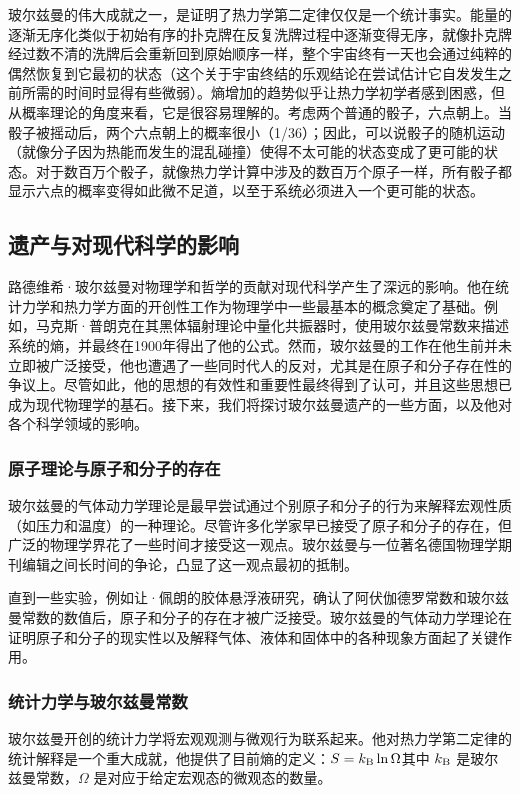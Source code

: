玻尔兹曼的伟大成就之一，是证明了热力学第二定律仅仅是一个统计事实。能量的逐渐无序化类似于初始有序的扑克牌在反复洗牌过程中逐渐变得无序，就像扑克牌经过数不清的洗牌后会重新回到原始顺序一样，整个宇宙终有一天也会通过纯粹的偶然恢复到它最初的状态（这个关于宇宙终结的乐观结论在尝试估计它自发发生之前所需的时间时显得有些微弱）。熵增加的趋势似乎让热力学初学者感到困惑，但从概率理论的角度来看，它是很容易理解的。考虑两个普通的骰子，六点朝上。当骰子被摇动后，两个六点朝上的概率很小（1/36）；因此，可以说骰子的随机运动（就像分子因为热能而发生的混乱碰撞）使得不太可能的状态变成了更可能的状态。对于数百万个骰子，就像热力学计算中涉及的数百万个原子一样，所有骰子都显示六点的概率变得如此微不足道，以至于系统必须进入一个更可能的状态。
\subsection{遗产与对现代科学的影响}
路德维希·玻尔兹曼对物理学和哲学的贡献对现代科学产生了深远的影响。他在统计力学和热力学方面的开创性工作为物理学中一些最基本的概念奠定了基础。例如，马克斯·普朗克在其黑体辐射理论中量化共振器时，使用玻尔兹曼常数来描述系统的熵，并最终在1900年得出了他的公式。然而，玻尔兹曼的工作在他生前并未立即被广泛接受，他也遭遇了一些同时代人的反对，尤其是在原子和分子存在性的争议上。尽管如此，他的思想的有效性和重要性最终得到了认可，并且这些思想已成为现代物理学的基石。接下来，我们将探讨玻尔兹曼遗产的一些方面，以及他对各个科学领域的影响。
\subsubsection{原子理论与原子和分子的存在}
玻尔兹曼的气体动力学理论是最早尝试通过个别原子和分子的行为来解释宏观性质（如压力和温度）的一种理论。尽管许多化学家早已接受了原子和分子的存在，但广泛的物理学界花了一些时间才接受这一观点。玻尔兹曼与一位著名德国物理学期刊编辑之间长时间的争论，凸显了这一观点最初的抵制。

直到一些实验，例如让·佩朗的胶体悬浮液研究，确认了阿伏伽德罗常数和玻尔兹曼常数的数值后，原子和分子的存在才被广泛接受。玻尔兹曼的气体动力学理论在证明原子和分子的现实性以及解释气体、液体和固体中的各种现象方面起了关键作用。
\subsubsection{统计力学与玻尔兹曼常数}
玻尔兹曼开创的统计力学将宏观观测与微观行为联系起来。他对热力学第二定律的统计解释是一个重大成就，他提供了目前熵的定义：\(S = k_{\rm{B}} \ln \Omega \)其中 \( k_{\rm{B}} \) 是玻尔兹曼常数，\( \Omega \) 是对应于给定宏观态的微观态的数量。

